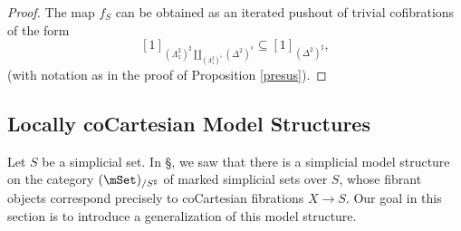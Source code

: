 \begin{proof}
The map $f_{S}$ can be obtained as an iterated pushout of trivial cofibrations of the form
$$[1]_{ ( \Lambda^2_1)^{\sharp} \coprod_{ ( \Lambda^2_1)^{\flat} } (\Delta^2)^{\flat}}
\subseteq [1]_{ (\Delta^2)^{\sharp}},$$
(with notation as in the proof of Proposition \ref{presus}). 
\end{proof}

\subsection{Locally coCartesian Model Structures}\label{bisec3.2}

Let $S$ be a simplicial set. In \S {}, we saw that there is
a simplicial model structure on the category $(\mSet)_{/S^{\sharp}}$ of marked simplicial
sets over $S$, whose fibrant objects correspond precisely to coCartesian fibrations
$X \rightarrow S$. Our goal in this section is to introduce a generalization of this model structure.

